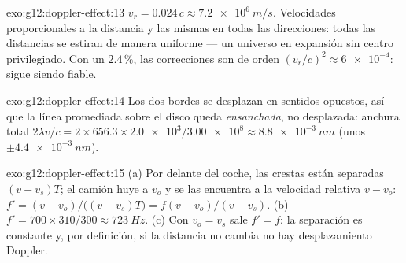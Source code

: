 \begin{solution}{exo:g12:doppler-effect:13}
$v_r = 0.024\,c \approx \qty{7.2e6}{m/s}$. Velocidades proporcionales a
la distancia y las mismas en todas las direcciones: todas las distancias
se estiran de manera uniforme --- un universo en expansión sin centro
privilegiado. Con un $2.4\,\%$, las correcciones son de orden
$(v_r/c)^2 \approx \num{6e-4}$: sigue siendo fiable.
\end{solution}

\begin{solution}{exo:g12:doppler-effect:14}
Los dos bordes se desplazan en sentidos opuestos, así que la línea
promediada sobre el disco queda \emph{ensanchada}, no desplazada:
anchura total
$2\lambda v/c = 2 \times 656.3 \times \num{2.0e3}/\num{3.00e8}
\approx \qty{8.8e-3}{nm}$ (unos $\pm\qty{4.4e-3}{nm}$).
\end{solution}

\begin{solution}{exo:g12:doppler-effect:15}
(a) Por delante del coche, las crestas están separadas $(v - v_s)T$; el
camión huye a $v_o$ y se las encuentra a la velocidad relativa
$v - v_o$: $f' = (v - v_o)/\bigl((v - v_s)T\bigr) =
f(v - v_o)/(v - v_s)$. (b)
$f' = 700 \times 310/300 \approx \qty{723}{Hz}$. (c) Con $v_o = v_s$
sale $f' = f$: la separación es constante y, por definición, si la
distancia no cambia no hay desplazamiento Doppler.
\end{solution}


